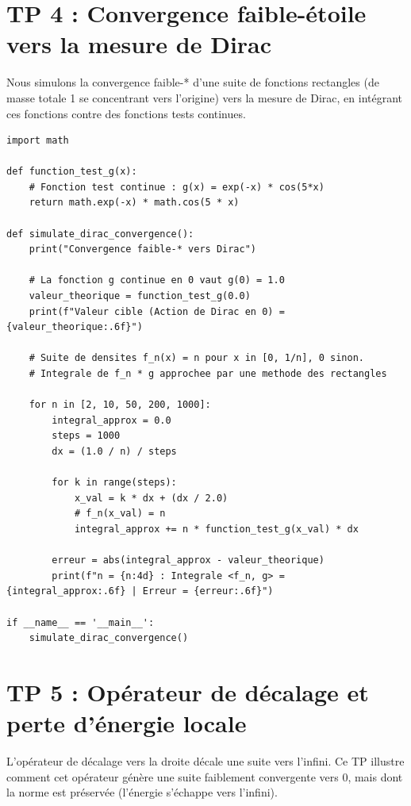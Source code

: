 \documentclass[11pt,a4paper]{article}
\begin{document}
\section{TP 4 : Convergence faible-étoile vers la mesure de Dirac}

Nous simulons la convergence faible-* d'une suite de fonctions rectangles (de masse totale 1 se concentrant vers l'origine) vers la mesure de Dirac, en intégrant ces fonctions contre des fonctions tests continues.

\begin{lstlisting}
import math

def function_test_g(x):
    # Fonction test continue : g(x) = exp(-x) * cos(5*x)
    return math.exp(-x) * math.cos(5 * x)

def simulate_dirac_convergence():
    print("Convergence faible-* vers Dirac")

    # La fonction g continue en 0 vaut g(0) = 1.0
    valeur_theorique = function_test_g(0.0)
    print(f"Valeur cible (Action de Dirac en 0) = {valeur_theorique:.6f}")

    # Suite de densites f_n(x) = n pour x in [0, 1/n], 0 sinon.
    # Integrale de f_n * g approchee par une methode des rectangles

    for n in [2, 10, 50, 200, 1000]:
        integral_approx = 0.0
        steps = 1000
        dx = (1.0 / n) / steps

        for k in range(steps):
            x_val = k * dx + (dx / 2.0)
            # f_n(x_val) = n
            integral_approx += n * function_test_g(x_val) * dx

        erreur = abs(integral_approx - valeur_theorique)
        print(f"n = {n:4d} : Integrale <f_n, g> = {integral_approx:.6f} | Erreur = {erreur:.6f}")

if __name__ == '__main__':
    simulate_dirac_convergence()
\end{lstlisting}


\section{TP 5 : Opérateur de décalage et perte d'énergie locale}

L'opérateur de décalage vers la droite décale une suite vers l'infini. Ce TP illustre comment cet opérateur génère une suite faiblement convergente vers 0, mais dont la norme est préservée (l'énergie s'échappe vers l'infini).
\end{document}
